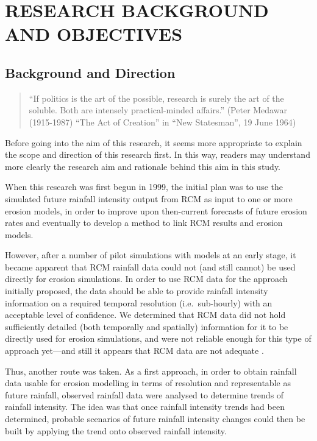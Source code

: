\chapter{RESEARCH BACKGROUND AND OBJECTIVES}
\label{sec:RESEARCHOBJECTIVES}

\section{Background and Direction}
\label{sec:ResearchBackgroundandDirection}

\begin{quotation}
\small ``If politics is the art of the possible, research is surely the art of
the soluble. Both are intensely practical-minded affairs.'' (Peter Medawar
(1915-1987) ``The Act of Creation'' in ``New Statesman'', 19 June 1964)
\end{quotation}

Before going into the aim of this research, it seems more appropriate to explain
the scope and direction of this research first. In this way, readers may
understand more clearly the research aim and rationale behind this aim in this
study.

When this research was first begun in 1999, the initial plan was to use the
simulated future rainfall intensity output from RCM as input to one or more
erosion models, in order to improve upon then-current forecasts of future
erosion rates and eventually to develop a method to link RCM results and erosion
models.

However, after a number of pilot simulations with models at an early stage, it
became apparent that RCM rainfall data could not (and still cannot) be used
directly for erosion simulations. In order to use RCM data for the approach
initially proposed, the data should be able to provide rainfall intensity
information on a required temporal resolution (i.e.\ sub-hourly) with an
acceptable level of confidence. We determined that RCM data did not hold
sufficiently detailed (both temporally and spatially) information for it to
be directly used for erosion simulations, and were not
reliable enough for this type of approach yet---and still it appears that
RCM data are not adequate
\citep{nearing2001-229,michael2005-155,o'neal2005-165}.

Thus, another route was taken. As a first approach, in order to obtain
rainfall data usable for erosion modelling in terms of resolution and
representable as
future rainfall, observed rainfall data were analysed to determine trends of
rainfall intensity. The idea was that once rainfall intensity trends had been
determined, probable
scenarios of future rainfall intensity changes could then be built by applying
the trend onto observed rainfall intensity.

